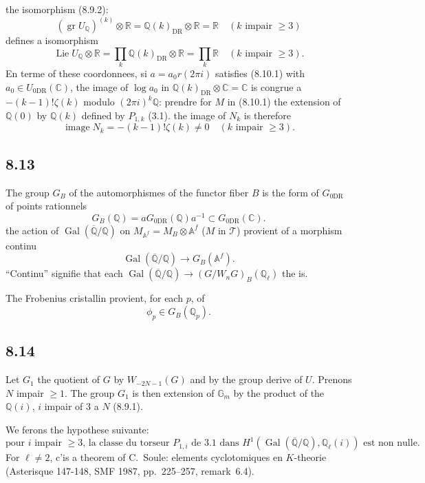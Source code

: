 \documentclass[12pt,a4paper]{article}
\theoremstyle{plain}
\theoremstyle{definition}
\theoremstyle{remark}
\DeclareMathOperator{\Lie}{Lie}
\DeclareMathOperator{\gr}{gr}
\DeclareMathOperator{\Gal}{Gal}
\DeclareMathOperator{\image}{image}
\newcommand{\Gm}{\mathbb{G}_m}
\newcommand{\Q}{\mathbb{Q}}
\newcommand{\C}{\mathbb{C}}
\newcommand{\R}{\mathbb{R}}
\newcommand{\Af}{\mathbb{A}^f}
\newcommand{\DR}{\mathrm{DR}}
\begin{document}
the isomorphism (8.9.2):
$$(\gr U_\Q)^{(k)} \otimes \R = \Q(k)_{\DR} \otimes \R = \R \quad (k \text{ impair } \geq 3)$$
defines a isomorphism
$$\Lie U_\Q \otimes \R = \prod_k \Q(k)_{\DR} \otimes \R = \prod_k \R \quad (k \text{ impair } \geq 3).$$
En terme of these coordonnees, si $a = a_0 r(2\pi i)$ satisfies (8.10.1) with $a_0 \in U_{0\DR}(\C)$, the image of $\log a_0$ in $\Q(k)_{\DR} \otimes \C = \C$ is congrue a $-(k-1)!\zeta(k)$ modulo $(2\pi i)^k \Q$: prendre for $M$ in (8.10.1) the extension of $\Q(0)$ by $\Q(k)$ defined by $P_{1,k}$ (3.1). the image of $N_k$ is therefore
\begin{equation}\label{8.12.1}
\image N_k = -(k-1)!\zeta(k) \neq 0 \quad (k \text{ impair } \geq 3). \tag{8.12.1}
\end{equation}

\subsection*{8.13}

The group $G_B$ of the automorphismes of the functor fiber $B$ is the form of $G_{0\DR}$ of points rationnels
\begin{equation}\label{8.13.1}
G_B(\Q) = a G_{0\DR}(\Q) a^{-1} \subset G_{0\DR}(\C). \tag{8.13.1}
\end{equation}
the action of $\Gal(\overline{\Q}/\Q)$ on $M_{\Af} = M_B \otimes \Af$ ($M$ in $\mathcal{T}$) provient of a morphism continu
\begin{equation}\label{8.13.2}
\Gal(\overline{\Q}/\Q) \longrightarrow G_B(\Af). \tag{8.13.2}
\end{equation}
``Continu'' signifie that each $\Gal(\overline{\Q}/\Q) \to (G/W_nG)_B(\Q_\ell)$ the is.

The Frobenius cristallin provient, for each $p$, of
\begin{equation}\label{8.13.3}
\phi_p \in G_B(\Q_p). \tag{8.13.3}
\end{equation}

\subsection*{8.14}

Let $G_1$ the quotient of $G$ by $W_{-2N-1}(G)$ and by the group derive of $U$. Prenons $N$ impair $\geq 1$. The group $G_1$ is then extension of $\Gm$ by the product of the $\Q(i)$, $i$ impair of $3$ a $N$ (8.9.1).

We ferons the hypothese suivante:
\begin{equation}\label{8.14.1}
\text{pour $i$ impair $\geq 3$, la classe du torseur $P_{1,i}$ de 3.1 dans $H^1(\Gal(\overline{\Q}/\Q), \Q_\ell(i))$ est non nulle.} \tag{8.14.1}
\end{equation}
For $\ell \neq 2$, c'is a theorem of C.~Soule: elements cyclotomiques en $K$-theorie (Asterisque 147-148, SMF 1987, pp.~225--257, remark~6.4).
\end{document}
